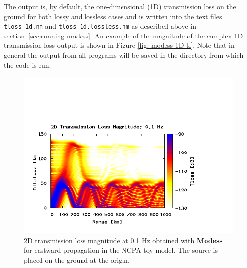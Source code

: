 The output is, by default, the one-dimensional (1D) transmission loss on the ground for both lossy and lossless cases and is written into the text files \verb+tloss_1d.nm+ and \verb+tloss_1d.lossless.nm+ as described above in section~\ref{sec:running modess}.  An example of the magnitude of the complex 1D transmission loss output is shown in Figure \ref{fig: modess 1D tl}. Note that in general the output from all programs will be saved in the directory from which the code is run.  
\begin{figure}
\begin{center}
\includegraphics[scale=0.45,trim = 20 20 110 140,clip]{figs/modess_ex2.png}
\end{center}
\caption{2D transmission loss magnitude at 0.1 Hz obtained with {\bf Modess} for eastward propagation in the NCPA toy model. The source is placed on the ground at the origin.}
\label{fig: modess 2D tl}
\end{figure}

